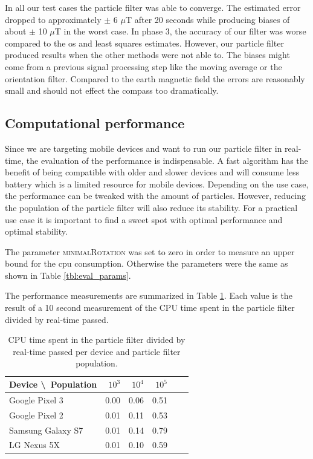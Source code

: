 In all our test cases the particle filter was able to converge. The estimated error dropped to approximately $\pm$ 6 $\mu$T after 20 seconds while producing biases of about $\pm$ 10 $\mu$T in the worst case. In phase 3, the accuracy of our filter was worse compared to the \gls{os} and least squares estimates. However, our particle filter produced results when the other methods were not able to. The biases might come from a previous signal processing step like the moving average or the orientation filter. Compared to the earth magnetic field the errors are reasonably small and should not effect the compass too dramatically.

\subsection{Computational performance}

Since we are targeting mobile devices and want to run our particle filter in real-time, the evaluation of the performance is indispensable. A fast algorithm has the benefit of being compatible with older and slower devices and will consume less battery which is a limited resource for mobile devices. Depending on the use case, the performance can be tweaked with the amount of particles. However, reducing the population of the particle filter will also reduce its stability. For a practical use case it is important to find a sweet spot with optimal performance and optimal stability.

The parameter \textsc{minimalRotation} was set to zero in order to measure an upper bound for the \gls{cpu} consumption. Otherwise the parameters were the same as shown in Table \ref{tbl:eval_params}.

The performance measurements are summarized in Table \ref{tbl:eval_performance}. Each value is the result of a 10 second measurement of the CPU time spent in the particle filter divided by real-time passed.

\begin{table}[h]
    \centering
    \begin{tabular}{ | l | r | r | r | r | r | }
    \hline
    \textbf{Device \textbackslash \ Population} & $10^3$ & $10^4$ & $10^5$ \\ \hline
    Google Pixel 3    & 0.00 & 0.06 & 0.51 \\ \hline
    Google Pixel 2    & 0.01 & 0.11 & 0.53  \\ \hline
    Samsung Galaxy S7 & 0.01 & 0.14 & 0.79  \\ \hline
    LG Nexus 5X       & 0.01 & 0.10 & 0.59  \\ \hline
    \end{tabular}
    \caption{CPU time spent in the particle filter divided by real-time passed per device and particle filter population.}
    \label{tbl:eval_performance}
\end{table}
